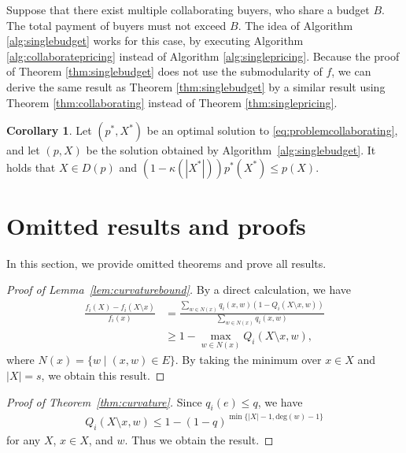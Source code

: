 \documentclass[letterpaper]{article}
\theoremstyle{definition}
\newtheorem{corollary}[theorem]{Corollary}
\begin{document}
Suppose that there exist multiple collaborating buyers, who share a budget $B$. 
The total payment of buyers must not exceed $B$. 
The idea of Algorithm \ref{alg:singlebudget} works for this case, by executing Algorithm \ref{alg:collaboratepricing} instead of Algorithm \ref{alg:singlepricing}. 
Because the proof of Theorem \ref{thm:singlebudget} does not use the submodularity of $f$, we can derive the same result as Theorem \ref{thm:singlebudget} by a similar result using Theorem \ref{thm:collaborating} instead of Theorem \ref{thm:singlepricing}. 
\begin{corollary}
Let $(p^*, X^*)$ be an optimal solution to \eqref{eq:problemcollaborating},
and let $(p, X)$ be the solution obtained by Algorithm~\ref{alg:singlebudget}.
It holds that $X\in D(p)$ and \((1-\kappa(|X^*|))p^*(X^*)\le p(X)\).
\end{corollary}

\section{Omitted results and proofs}

In this section, we provide omitted theorems and prove all results. 

\begin{proof}[Proof of Lemma~\ref{lem:curvaturebound}]
By a direct calculation, we have
\begin{align}
  \frac{f_i(X) - f_i(X \setminus x)}{f_i(x)}
  &= \frac{\displaystyle \sum_{w \in N(x)} q_i(x, w) (1 - Q_i(X \setminus x, w))}{\displaystyle \sum_{w \in N(x)} q_i(x, w)} \nonumber \\
  &\ge 1 - \max_{w \in N(x)} Q_i(X \setminus x, w),
\end{align}
where $N(x) = \{ w \mid (x, w) \in E \}$. 
By taking the minimum over $x \in X$ and $|X| = s$, we obtain this result.
\end{proof}

\begin{proof}[Proof of Theorem~\ref{thm:curvature}]
Since $q_i(e) \le q$, we have
\begin{align}
  Q_i(X \setminus x, w) \le 1 - (1 - q)^{\min\{|X|-1, \mathrm{deg}(w)-1\}}
\end{align}
for any $X$, $x\in X$, and $w$.
Thus we obtain the result.
\end{proof}
\end{document}
